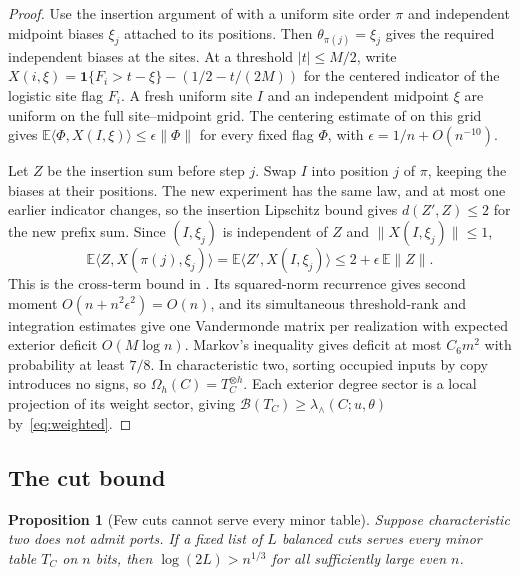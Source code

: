 \documentclass[11pt]{article}
\newtheorem{proposition}[theorem]{Proposition}
\theoremstyle{remark}
\newcommand{\E}{\mathbb E}
\newcommand{\price}{\mathcal B}
\newcommand{\one}{\mathbf 1}
\newcommand{\ip}[2]{\langle #1,#2\rangle}
\newcommand{\norm}[1]{\lVert #1\rVert}
\newcommand{\lamext}{\lambda_\wedge}
\begin{document}
\begin{proof}
Use the insertion argument of \cite[Section 10.3]{hc} with a uniform site
order \(\pi\) and independent midpoint biases \(\xi_j\) attached to its
positions. Then \(\theta_{\pi(j)}=\xi_j\) gives the required independent
biases at the sites. At a threshold \(|t|\le M/2\), write
\(X(i,\xi)=\one\{F_i>t-\xi\}-(1/2-t/(2M))\) for the centered indicator
of the logistic site flag \(F_i\). A fresh uniform site \(I\) and an
independent midpoint \(\xi\) are uniform on the full site--midpoint grid.
The centering estimate of \cite[Section 10.3]{hc} on this grid gives
\(\E\ip{\Phi}{X(I,\xi)}\le\epsilon\norm{\Phi}\) for every fixed flag
\(\Phi\), with \(\epsilon=1/n+O(n^{-10})\).

Let \(Z\) be the insertion sum before step \(j\). Swap \(I\) into position
\(j\) of \(\pi\), keeping the biases at their positions. The new experiment
has the same law, and at most one earlier indicator changes, so the
insertion Lipschitz bound gives \(d(Z',Z)\le2\) for the new prefix sum.
Since \((I,\xi_j)\) is independent of \(Z\) and \(\norm{X(I,\xi_j)}\le1\),
\[
 \E\ip{Z}{X(\pi(j),\xi_j)}
 =\E\ip{Z'}{X(I,\xi_j)}
 \le 2+\epsilon\,\E\norm Z .
\]
This is the cross-term bound in \cite[Section 10.3]{hc}. Its squared-norm
recurrence gives second moment \(O(n+n^2\epsilon^2)=O(n)\), and its
simultaneous threshold-rank and integration estimates give one Vandermonde
matrix per realization with expected exterior deficit \(O(M\log n)\).
Markov's inequality gives deficit at most \(C_6m^2\) with probability
at least \(7/8\). In characteristic two, sorting occupied inputs by copy
introduces no signs, so \(\Omega_h(C)=T_C^{\otimes h}\). Each exterior
degree sector is a local projection of its weight sector, giving
\(\price(T_C)\ge\lamext(C;u,\theta)\) by~\eqref{eq:weighted}.
\end{proof}

\subsection{The cut bound}

\begin{proposition}[Few cuts cannot serve every minor table]\label{prop:cuts}
Suppose characteristic two does not admit ports. If a fixed list of \(L\)
balanced cuts serves every minor table \(T_C\) on \(n\) bits, then
\(\log(2L)>n^{1/3}\) for all sufficiently large even \(n\).
\end{proposition}
\end{document}
